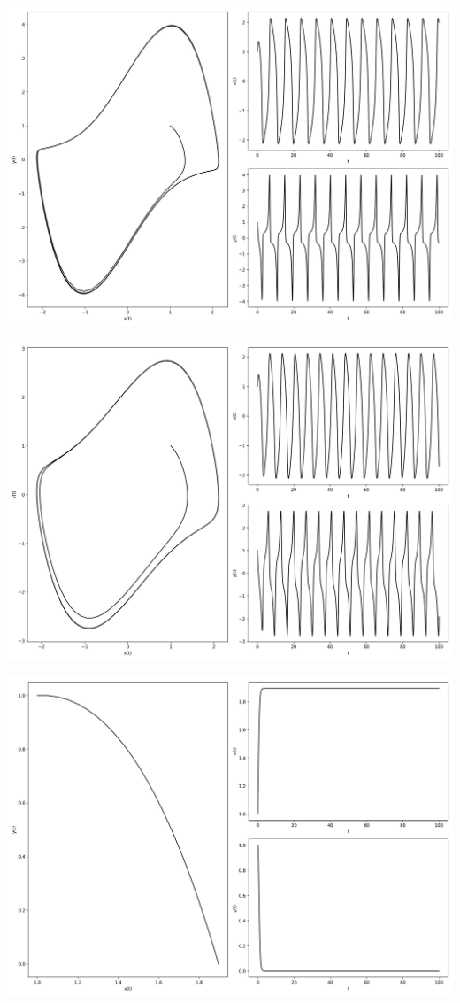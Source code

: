 \documentclass[12pt,a4paper]{jsarticle}
\makeatletter
\def\figcaption{\def\@captype{figure}\caption}
\makeatother
\begin{document}
\figcaption{$x_0=1,00, y_0=1.00, \mu=0.00, \omega=1.00, T = 100, N = 2000$}
\includegraphics[scale=0.33]{x1,0y1,0mu2,0omega1,0t1,00e+02n2,00e+03.png}
\figcaption{$x_0=1,00, y_0=1.00, \mu=2.00, \omega=1.00, T = 100, N = 2000$}
\includegraphics[scale=0.33]{x1,0y1,0mu1,0omega-1,0t1,00e+02n2,00e+03.png}
\figcaption{$x_0=1,00, y_0=1.00, \mu=1.00, \omega=-1.00, T = 200, N = 2000$}
\includegraphics[scale=0.33]{x1,0y1,0mu1,0omega0,0t1,00e+02n2,00e+03.png}
\end{document}
